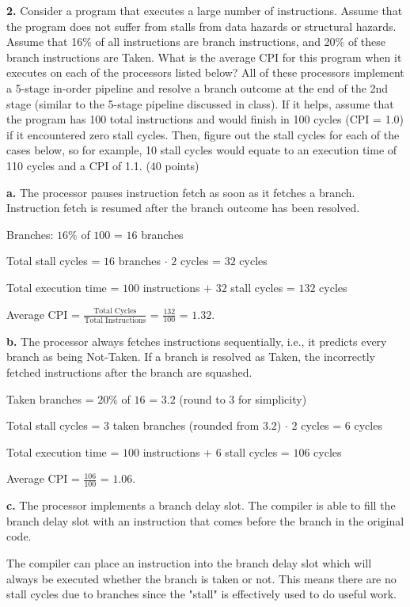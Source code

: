 \documentclass{article}
\begin{document}
\textbf{2.} Consider a program that executes a large number of instructions. Assume that the program does
not suffer from stalls from data hazards or structural hazards. Assume that 16\% of all instructions are
branch instructions, and 20\% of these branch instructions are Taken. What is the average CPI for this
program when it executes on each of the processors listed below? All of these processors implement a
5-stage in-order pipeline and resolve a branch outcome at the end of the 2nd stage (similar to the 5-stage
pipeline discussed in class). If it helps, assume that the program has 100 total instructions and would
finish in 100 cycles (CPI = 1.0) if it encountered zero stall cycles. Then, figure out the stall cycles
for each of the cases below, so for example, 10 stall cycles would equate to an execution time of 110
cycles and a CPI of 1.1. (40 points)

\textbf{a.} The processor pauses instruction fetch as soon as it fetches a branch. Instruction fetch is
resumed after the branch outcome has been resolved.

Branches: $16\%$ of $100$ = $16$ branches

Total stall cycles = $16$ branches $\cdot$ $2$ cycles = $32$ cycles

Total execution time = $100$ instructions $+$ $32$ stall cycles = $132$ cycles

Average CPI = $\frac{\text{Total Cycles}}{\text{Total Instructions}}$ = $\frac{132}{100}$ = $1.32$.

\textbf{b.} The processor always fetches instructions sequentially, i.e., it predicts every branch as
being Not-Taken. If a branch is resolved as Taken, the incorrectly fetched instructions after the branch
are squashed.

Taken branches = $20\%$ of $16$ = $3.2$ (round to $3$ for simplicity)

Total stall cycles = $3$ taken branches (rounded from $3.2$) $\cdot$ $2$ cycles = $6$ cycles

Total execution time = $100$ instructions $+$ $6$ stall cycles = $106$ cycles

Average CPI = $\frac{106}{100}$ = $1.06$.

\textbf{c.} The processor implements a branch delay slot. The compiler is able to fill the branch delay
slot with an instruction that comes before the branch in the original code.

The compiler can place an instruction into the branch delay slot which will always be executed whether
the branch is taken or not. This means there are no stall cycles due to branches since the "stall" is
effectively used to do useful work.
\end{document}
